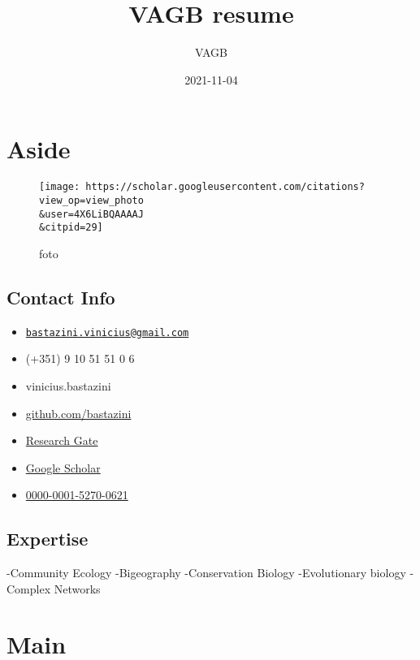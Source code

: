 \documentclass[
]{article}
\title{VAGB resume}
\author{VAGB}
\date{2021-11-04}
\providecommand{\tightlist}{%
  \setlength{\itemsep}{0pt}\setlength{\parskip}{0pt}}
\begin{document}
\maketitle

\hypertarget{aside}{%
\section{Aside}\label{aside}}

\begin{figure}
\centering
\texttt{[image: https://scholar.googleusercontent.com/citations?view\_op=view\_photo\\\&user=4X6LiBQAAAAJ\\\&citpid=29]}
\caption{foto}
\end{figure}

\hypertarget{contact}{%
\subsection{Contact Info}\label{contact}}

\begin{itemize}
\tightlist
\item

  \href{mailto:bastazini.vinicius@gmail.com}{\nolinkurl{bastazini.vinicius@gmail.com}}
\item
  (+351) 9 10 51 51 0 6
\item
  vinicius.bastazini
\item
  \href{https://github.com/bastazini}{github.com/bastazini}
\item

  \href{https://www.researchgate.net/profile/Vinicius-Bastazini-2}{Research
  Gate}
\item

  \href{https://scholar.google.com/citations?user=4X6LiBQAAAAJ\&hl=pt-BR}{Google
  Scholar}
\item
  \href{https://orcid.org/0000-0001-5270-0621}{0000-0001-5270-0621}
\end{itemize}

\hypertarget{skills}{%
\subsection{Expertise}\label{skills}}

-Community Ecology -Bigeography -Conservation Biology -Evolutionary
biology -Complex Networks

\hypertarget{main}{%
\section{Main}\label{main}}
\end{document}

